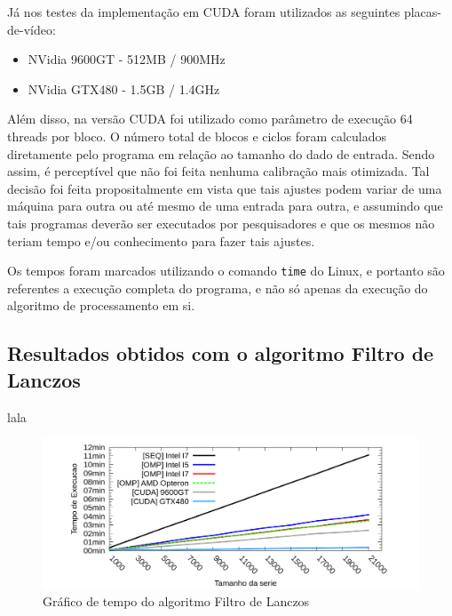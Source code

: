 Já nos testes da implementação em CUDA foram utilizados as seguintes placas-de-vídeo:

\begin{itemize}
\item NVidia	 9600GT - 512MB / 900MHz
\item NVidia GTX480 - 1.5GB / 1.4GHz
\end{itemize}

Além disso, na versão CUDA foi utilizado como parâmetro de execução 64 threads por bloco. O número total de blocos e ciclos foram calculados diretamente pelo programa em relação ao tamanho do dado de entrada. Sendo assim, é perceptível que não foi feita nenhuma calibração mais otimizada. Tal decisão foi feita propositalmente em vista que tais ajustes podem variar de uma máquina para outra ou até mesmo de uma entrada para outra, e assumindo que tais programas deverão ser executados por pesquisadores e que os mesmos não teriam tempo e/ou conhecimento para fazer tais ajustes.

Os tempos foram marcados utilizando o comando \texttt{time} do Linux, e portanto são referentes a execução completa do programa, e não só apenas da execução do algoritmo de processamento em si.

\subsection{Resultados obtidos com o algoritmo Filtro de Lanczos}

lala

\begin{figure}[H]
\centering
\includegraphics[width=1.0\textwidth]{Imagens/graficos_lanczos/lanczos_tempos.png}
\caption{Gráfico de tempo do algoritmo Filtro de Lanczos}
\label{fig:grafico_tempo_lanczos}
\end{figure}

